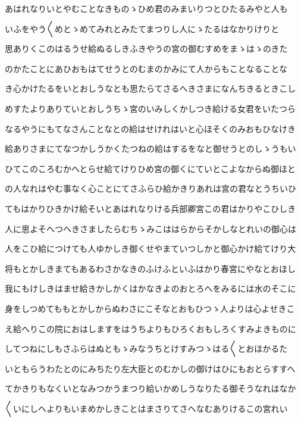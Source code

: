 \documentclass[a4paper,11pt,landscape]{ltjtarticle}
\begin{document}
\par\medskip
あはれなりいとやむことなきものゝひめ君のみまいりつとひたるみやと人も
\par\medskip
いふをやう〱めとゝめてみれとみたてまつりし人にゝたるはなかりけりと
\par\medskip
思ありくこのはるうせ給ぬるしきふきやうの宮の御むすめをまゝはゝのきた
\par\medskip
のかたことにあひおもはてせうとのむまのかみにて人からもことなることな
\par\medskip
き心かけたるをいとおしうなとも思たらてさるへきさまになんちきるときこし
\par\medskip
めすたよりありていとおしうちゝ宮のいみしくかしつき給ける女君をいたつら
\par\medskip
なるやうにもてなさんことなとの給はせけれはいと心ほそくのみおもひなけき
\par\medskip
給ありさまにてなつかしうかくたつねの給はするをなと御せうとのしゝうもい
\par\medskip
ひてこのころむかへとらせ給てけりひめ宮の御くにていとこよなからぬ御ほと
\par\medskip
の人なれはやむ事なく心ことにてさふらひ給かきりあれは宮の君なとうちいひ
\par\medskip
てもはかりひきかけ給そいとあはれなりける兵部卿宮この君はかりやこひしき
\par\medskip
人に思よそへつへきさましたらむちゝみこははらからそかしなとれいの御心は
\par\medskip
人をこひ給につけても人ゆかしき御くせやまていつしかと御心かけ給てけり大
\par\medskip
将もとかしきまてもあるわさかなきのふけふといふはかり春宮にやなとおほし
\par\medskip
我にもけしきはませ給きかしかくはかなきよのおとろへをみるには水のそこに
\par\medskip
身をしつめてももとかしからぬわさにこそなとおもひつゝ人よりは心よせきこ
\par\medskip
え給へりこの院におはしますをはうちよりもひろくおもしろくすみよきものに
\par\medskip
してつねにしもさふらはぬともゝみなうちとけすみつゝはる〱とおほかるた
\par\medskip
いともらうわたとのにみちたり左大臣とのむかしの御けはひにもおとらすすへ
\par\medskip
てかきりもなくいとなみつかうまつり給いかめしうなりたる御そうなれはなか
\par\medskip
〱いにしへよりもいまめかしきことはまさりてさへなむありけるこの宮れい
\par\medskip
\end{document}
